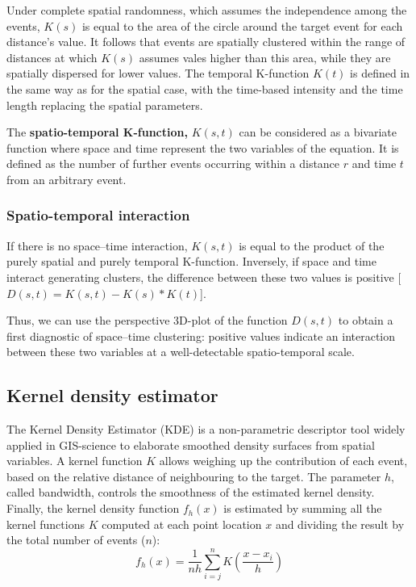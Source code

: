 \documentclass[
]{book}
\begin{document}
Under complete spatial randomness, which assumes the independence among the events, \(K(s)\) is equal to the area of the circle around the target event for each distance's value.
It follows that events are spatially clustered within the range of distances at which \(K(s)\) assumes vales higher than this area, while they are spatially dispersed for lower values.
The temporal K-function \(K(t)\) is defined in the same way as for the spatial case, with the time-based intensity and the time length replacing the spatial parameters.

The \textbf{spatio-temporal K-function,} \(K(s,t)\) can be considered as a bivariate function where space and time represent the two variables of the equation.
It is defined as the number of further events occurring within a distance \(r\) and time \(t\) from an arbitrary event.

\hypertarget{spatio-temporal-interaction}{%
\subsubsection{Spatio-temporal interaction}\label{spatio-temporal-interaction}}

If there is no space--time interaction, \(K(s,t)\) is equal to the product of the purely spatial and purely temporal K-function.
Inversely, if space and time interact generating clusters, the difference between these two values is positive {[}\(D(s,t)=K(s,t)-K(s)*K(t)\){]}.

Thus, we can use the perspective 3D-plot of the function \(D(s,t)\) to obtain a first diagnostic of space--time clustering: positive values indicate an interaction between these two variables at a well-detectable spatio-temporal scale.

\hypertarget{kernel-density-estimator-1}{%
\subsection{Kernel density estimator}\label{kernel-density-estimator-1}}

The Kernel Density Estimator (KDE) is a non-parametric descriptor tool widely applied in GIS-science to elaborate smoothed density surfaces from spatial variables.
A kernel function \(K\) allows weighing up the contribution of each event, based on the relative distance of neighbouring to the target.
The parameter \(h\), called bandwidth, controls the smoothness of the estimated kernel density.
Finally, the kernel density function \(f_h(x)\) is estimated by summing all the kernel functions \(K\) computed at each point location \(x\) and dividing the result by the total number of events (\(n\)): \[f_h(x) = \frac{1}{nh}\sum_{i=j}^{n}K(\frac{x-x_i}{h})\]
\end{document}
